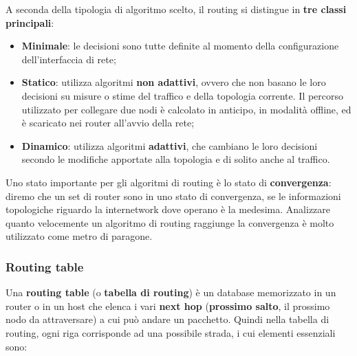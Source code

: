         A seconda della tipologia di algoritmo scelto, il routing si distingue in \textbf{tre classi principali}:

        \begin{itemize}
            \item \textbf{Minimale}: le decisioni sono tutte definite al momento della configurazione
            dell’interfaccia di rete;
            \item \textbf{Statico}: utilizza algoritmi \textbf{non adattivi}, ovvero che non basano le loro decisioni su
            misure o stime del traffico e della topologia corrente. Il percorso utilizzato per collegare
            due nodi è calcolato in anticipo, in modalità offline, ed è scaricato nei router all’avvio
            della rete;
            \item \textbf{Dinamico}: utilizza algoritmi \textbf{adattivi}, che cambiano le loro decisioni secondo le
            modifiche apportate alla topologia e di solito anche al traffico.
        \end{itemize}

        Uno stato importante per gli algoritmi di routing è lo stato di \textbf{convergenza}: diremo che un set
        di router sono in uno stato di convergenza, se le informazioni topologiche riguardo la
        internetwork dove operano è la medesima. Analizzare quanto velocemente un algoritmo di
        routing raggiunge la convergenza è molto utilizzato come metro di paragone.

            \subsubsection{Routing table}
            Una \textbf{routing table} (o \textbf{tabella di routing}) è un database memorizzato in un router o in un host
            che elenca i vari \textbf{next hop} (\textbf{prossimo salto}, il prossimo nodo da attraversare) a cui può andare
            un pacchetto. Quindi nella tabella di routing, ogni riga corrisponde ad una possibile strada, i cui
            elementi essenziali sono:
            
